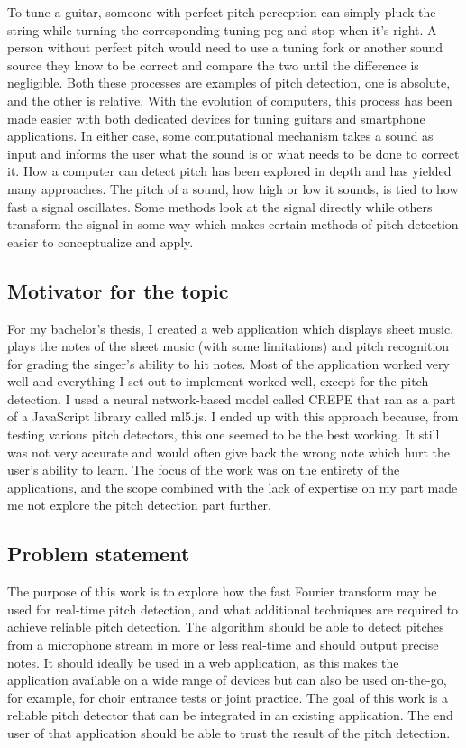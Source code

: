 To tune a guitar, someone with perfect pitch perception can simply pluck the string while turning the corresponding tuning peg and stop when it's right. A person without perfect pitch would need to use a tuning fork or another sound source they know to be correct and compare the two until the difference is negligible. Both these processes are examples of pitch detection, one is absolute, and the other is relative. With the evolution of computers, this process has been made easier with both dedicated devices for tuning guitars and smartphone applications. In either case, some computational mechanism takes a sound as input and informs the user what the sound is or what needs to be done to correct it. How a computer can detect pitch has been explored in depth and has yielded many approaches. The pitch of a sound, how high or low it sounds, is tied to how fast a signal oscillates. Some methods look at the signal directly while others transform the signal in some way which makes certain methods of pitch detection easier to conceptualize and apply.

\subsection{Motivator for the topic}
For my bachelor's thesis, I created a web application which displays sheet music, plays the notes of the sheet music (with some limitations) and pitch recognition for grading the singer's ability to hit notes. Most of the application worked very well and everything I set out to implement worked well, except for the pitch detection. I used a neural network-based model called CREPE that ran as a part of a JavaScript library called ml5.js. I ended up with this approach because, from testing various pitch detectors, this one seemed to be the best working. It still was not very accurate and would often give back the wrong note which hurt the user's ability to learn. The focus of the work was on the entirety of the applications, and the scope combined with the lack of expertise on my part made me not explore the pitch detection part further.  

\subsection{Problem statement}
The purpose of this work is to explore how the fast Fourier transform may be used for real-time pitch detection, and what additional techniques are required to achieve reliable pitch detection. The algorithm should be able to detect pitches from a microphone stream in more or less real-time and should output precise notes. It should ideally be used in a web application, as this makes the application available on a wide range of devices but can also be used on-the-go, for example, for choir entrance tests or joint practice. The goal of this work is a reliable pitch detector that can be integrated in an existing application. The end user of that application should be able to trust the result of the pitch detection. 

